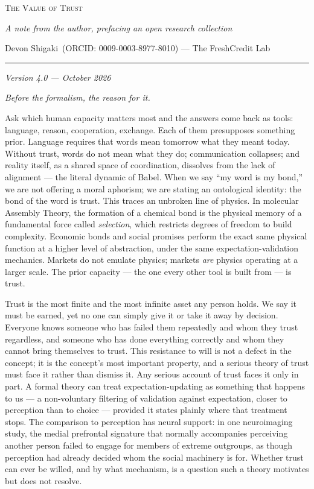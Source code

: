 \documentclass[
]{article}
\author{}
\date{}
\begin{document}
\textsc{The Value of Trust}

\emph{A note from the author, prefacing an open research collection}

Devon Shigaki~(ORCID: 0009-0003-8977-8010) --- The FreshCredit Lab

\begin{center}\rule{0.5\linewidth}{0.5pt}\end{center}

\emph{Version 4.0 --- October 2026}

\emph{Before the formalism, the reason for it.}

Ask which human capacity matters most and the answers come back as
tools: language, reason, cooperation, exchange. Each of them presupposes
something prior. Language requires that words mean tomorrow what they
meant today. Without trust, words do not mean what they do;
communication collapses; and reality itself, as a shared space of
coordination, dissolves from the lack of alignment --- the literal
dynamic of Babel. When we say ``my word is my bond,'' we are not
offering a moral aphorism; we are stating an ontological identity: the
bond of the word is trust. This traces an unbroken line of physics. In
molecular Assembly Theory, the formation of a chemical bond is the
physical memory of a fundamental force called \emph{selection}, which
restricts degrees of freedom to build complexity. Economic bonds and
social promises perform the exact same physical function at a higher
level of abstraction, under the same expectation-validation mechanics.
Markets do not emulate physics; markets \emph{are} physics operating at
a larger scale. The prior capacity --- the one every other tool is built
from --- is trust.

Trust is the most finite and the most infinite asset any person holds.
We say it must be earned, yet no one can simply give it or take it away
by decision. Everyone knows someone who has failed them repeatedly and
whom they trust regardless, and someone who has done everything
correctly and whom they cannot bring themselves to trust. This
resistance to will is not a defect in the concept; it is the concept's
most important property, and a serious theory of trust must face it
rather than dismiss it. Any serious account of trust faces it only in
part. A formal theory can treat expectation-updating as something that
happens to us --- a non-voluntary filtering of validation against
expectation, closer to perception than to choice --- provided it states
plainly where that treatment stops. The comparison to perception has
neural support: in one neuroimaging study, the medial prefrontal
signature that normally accompanies perceiving another person failed to
engage for members of extreme outgroups, as though perception had
already decided whom the social machinery is for. Whether trust can ever
be willed, and by what mechanism, is a question such a theory motivates
but does not resolve.
\end{document}
